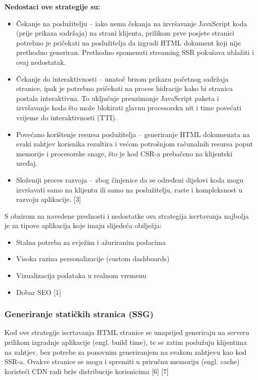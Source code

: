 \bigskip

\textbf{Nedostaci ove strategije su:}

\begin{itemize}
    \item Čekanje na poslužitelju – iako nema čekanja na izvršavanje JavaScript ko\-da (prije prikaza sadržaja) na strani klijenta, prilikom prve posjete stranici potrebno je pričekati na poslužitelja da izgradi HTML dokument koji nije prethodno generiran. Prethodno spomenuti streaming SSR pokušava ublažiti i ovaj nedostatak.
    \item Čekanje do interaktivnosti – unatoč brzom prikazu početnog sadržaja stranice, ipak je potrebno pričekati na proces hidracije kako bi stranica postala interaktivna. To uključuje preuzimanje JavaScript paketa i izvršavanje koda što može blokirati glavnu procesorsku nit i time povećati vrijeme do interaktivnosti (TTI).
    \item Povećano korištenje resursa poslužitelja – generiranje HTML dokumenata na svaki zahtjev korisnika rezultira i većom potrošnjom računalnih resursa poput memorije i procesorske snage, što je kod CSR-a prebačeno na klijentski uređaj.
    \item Složeniji proces razvoja – zbog činjenice da se određeni dijelovi koda mogu izvršavati samo na klijentu ili samo na poslužitelju, raste i kompleksnost u razvoju aplikacije. [3]
\end{itemize}

S obzirom na navedene prednosti i nedostatke ova strategija iscrtavanja najbolja je za tipove aplikacija koje imaju slijedeća obilježja:
\begin{itemize}
    \item Stalna potreba za svježim i ažuriranim podacima
    \item Visoka razina personalizacije (custom dashboards)
    \item Vizualizacija podataka u realnom vremenu
    \item Dobar SEO [1]
\end{itemize}

\subsubsection{Generiranje statičkih stranica (SSG)}

Kod ove strategije iscrtavanja HTML stranice se unaprijed generiraju na serveru prilikom izgradnje aplikacije (engl. build time), te se zatim poslužuju klijentima na zahtjev, bez potrebe za ponovnim generiranjem na svakom zahtjevu kao kod SSR-a. Ovakve stranice se mogu i spremiti u priručnu memoriju (engl. cache) koristeći CDN radi brže distribucije korisnicima [6] [7]

